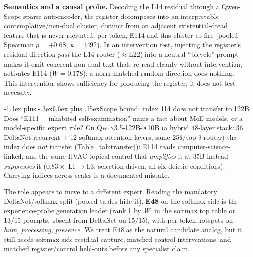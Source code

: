 \documentclass[10pt]{article}
\makeatletter
\renewcommand\section{\@startsection{section}{1}{\z@}%
  {-1.1ex plus -.3ex}{0.6ex plus .15ex}{\normalfont\large\bfseries}}
\newcommand{\W}{\textit{W}}
\makeatother
\begin{document}
\textbf{Semantics and a causal probe.} Decoding the L14 residual through a
Qwen-Scope sparse autoencoder, the register decomposes into an interpretable
contemplative/non-dual cluster, distinct from an adjacent existential-dread
feature that is never recruited; per token, E114 and this cluster co-fire (pooled
Spearman $\rho{=}+0.68$, $n{=}1492$). In an intervention test, injecting the
register's residual direction
\emph{past} the L14 router ($\approx$L22) into a neutral ``bicycle'' prompt makes
it emit coherent non-dual text that, re-read cleanly without intervention,
activates E114 ($\W{=}0.178$); a norm-matched random direction does nothing. This
intervention shows sufficiency for producing the register; it does not test
necessity.

\vspace{-0.4em}
\section{Scope bound: index 114 does not transfer to 122B}
\vspace{-0.2em}
Does ``E114 = inhabited self-examination'' name a fact about MoE models, or a
model-specific expert role? On \textsc{Qwen3.5-122B-A10B} (a hybrid 48-layer stack: 36 DeltaNet
recurrent + 12 softmax-attention layers, same 256/top-8 router) the index does
\emph{not} transfer (Table~\ref{tab:transfer}): E114 reads
computer-science-linked, and the same HVAC topical control that \emph{amplifies}
it at 35B instead \emph{suppresses} it ($0.83\times$ L1$\to$L3, selection-driven,
all six deictic conditions). Carrying indices across scales is a documented
mistake.

The role appears to move to a different expert. Reading the mandatory
DeltaNet/softmax split (pooled tables hide it), \textbf{E48} on the softmax side
is the experience-probe generation leader (rank 1 by \W; in the softmax top table
on 13/15 prompts, absent from DeltaNet on 15/15), with per-token hotspots on
\textit{hum, processing, presence}. We treat E48 as the natural candidate analog,
but it still needs softmax-side residual capture, matched control interventions,
and matched register/control held-outs before any specialist claim.
\end{document}
